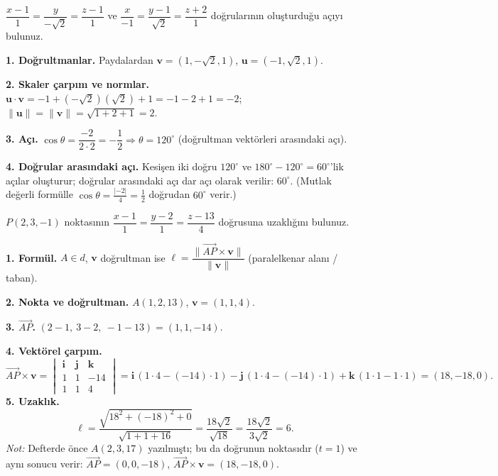 \begin{soru}
$\dfrac{x-1}{1}=\dfrac{y}{-\sqrt2}=\dfrac{z-1}{1}$ ve $\dfrac{x}{-1}=\dfrac{y-1}{\sqrt2}=\dfrac{z+2}{1}$ doğrularının oluşturduğu açıyı bulunuz.
\end{soru}
\begin{cevap}
\textbf{1. Doğrultmanlar.} Paydalardan $\mathbf v=(1,-\sqrt2,1)$, $\mathbf u=(-1,\sqrt2,1)$.

\textbf{2. Skaler çarpım ve normlar.}
$\mathbf u\cdot\mathbf v=-1+(-\sqrt2)(\sqrt2)+1=-1-2+1=-2$;\quad $\|\mathbf u\|=\|\mathbf v\|=\sqrt{1+2+1}=2$.

\textbf{3. Açı.} $\cos\theta=\dfrac{-2}{2\cdot2}=-\dfrac12\Rightarrow\theta=120^\circ$ (doğrultman vektörleri arasındaki açı).

\textbf{4. Doğrular arasındaki açı.} Kesişen iki doğru $120^\circ$ ve $180^\circ-120^\circ=60^\circ$'lik açılar oluşturur; doğrular arasındaki açı dar açı olarak verilir: $\boxed{60^\circ}$. (Mutlak değerli formülle $\cos\theta=\frac{|-2|}{4}=\frac12$ doğrudan $60^\circ$ verir.)
\end{cevap}

\begin{soru}
$P(2,3,-1)$ noktasının $\dfrac{x-1}{1}=\dfrac{y-2}{1}=\dfrac{z-13}{4}$ doğrusuna uzaklığını bulunuz.
\end{soru}
\begin{cevap}
\textbf{1. Formül.} $A\in d$, $\mathbf v$ doğrultman ise $\ell=\dfrac{\|\overrightarrow{AP}\times\mathbf v\|}{\|\mathbf v\|}$ (paralelkenar alanı / taban).

\textbf{2. Nokta ve doğrultman.} $A(1,2,13)$, $\mathbf v=(1,1,4)$.

\textbf{3. $\overrightarrow{AP}$.} $(2-1,\ 3-2,\ -1-13)=(1,1,-14)$.

\textbf{4. Vektörel çarpım.}
\[ \overrightarrow{AP}\times\mathbf v=\begin{vmatrix}\mathbf i&\mathbf j&\mathbf k\\1&1&-14\\1&1&4\end{vmatrix}
=\mathbf i\,(1\cdot4-(-14)\cdot1)-\mathbf j\,(1\cdot4-(-14)\cdot1)+\mathbf k\,(1\cdot1-1\cdot1)=(18,-18,0). \]
\textbf{5. Uzaklık.}
\[ \ell=\frac{\sqrt{18^2+(-18)^2+0}}{\sqrt{1+1+16}}=\frac{18\sqrt2}{\sqrt{18}}=\frac{18\sqrt2}{3\sqrt2}=\boxed{6}. \]
\textit{Not:} Defterde önce $A(2,3,17)$ yazılmıştı; bu da doğrunun noktasıdır ($t=1$) ve aynı sonucu verir: $\overrightarrow{AP}=(0,0,-18)$, $\overrightarrow{AP}\times\mathbf v=(18,-18,0)$.
\end{cevap}

